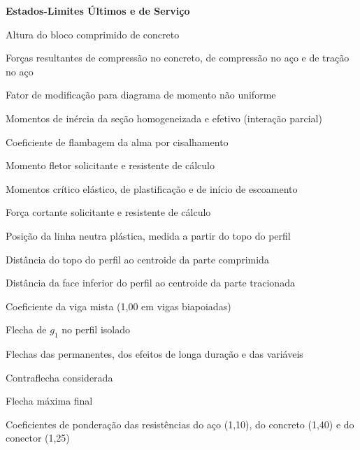 \begin{simbolos}
  \item[] \textbf{Estados-Limites Últimos e de Serviço}
  \item[$a$] Altura do bloco comprimido de concreto
  \item[$C_{cd}, C_{ad}, T_{ad}$] Forças resultantes de compressão no concreto, de compressão no aço e de tração no aço
  \item[$C_b$] Fator de modificação para diagrama de momento não uniforme
  \item[$I_{tr}, I_{ef}$] Momentos de inércia da seção homogeneizada e efetivo (interação parcial)
  \item[$k_v$] Coeficiente de flambagem da alma por cisalhamento
  \item[$M_{Sd}, M_{Rd}$] Momento fletor solicitante e resistente de cálculo
  \item[$M_{cr}, M_{pl}, M_r$] Momentos crítico elástico, de plastificação e de início de escoamento
  \item[$V_{Sd}, V_{Rd}$] Força cortante solicitante e resistente de cálculo
  \item[$y_p$] Posição da linha neutra plástica, medida a partir do topo do perfil
  \item[$y_c$] Distância do topo do perfil ao centroide da parte comprimida
  \item[$y_t$] Distância da face inferior do perfil ao centroide da parte tracionada
  \item[$\beta_{vm}$] Coeficiente da viga mista (1,00 em vigas biapoiadas)
  \item[$\delta_{g1}$] Flecha de $g_1$ no perfil isolado
  \item[$\delta_1, \delta_2, \delta_3$] Flechas das permanentes, dos efeitos de longa duração e das variáveis
  \item[$\delta_0$] Contraflecha considerada
  \item[$\delta_{max}$] Flecha máxima final
  \item[$\gamma_{a1}, \gamma_c, \gamma_{cs}$] Coeficientes de ponderação das resistências do aço (1,10), do concreto (1,40) e do conector (1,25)


\end{simbolos}
